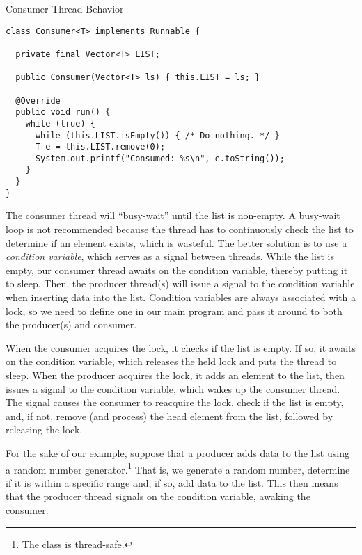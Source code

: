 \begin{cl}{Consumer Thread Behavior}
\begin{lstlisting}[language=MyJava]
class Consumer<T> implements Runnable {

  private final Vector<T> LIST;

  public Consumer(Vector<T> ls) { this.LIST = ls; }

  @Override
  public void run() {
    while (true) {
      while (this.LIST.isEmpty()) { /* Do nothing. */ }
      T e = this.LIST.remove(0);
      System.out.printf("Consumed: %s\n", e.toString());
    }
  }
}
\end{lstlisting}
\end{cl}

The consumer thread will ``busy-wait'' until the list is non-empty. A busy-wait loop is not recommended because the thread has to continuously check the list to determine if an element exists, which is wasteful. The better solution is to use a \textit{condition variable}, which serves as a signal between threads. While the list is empty, our consumer thread awaits on the condition variable, thereby putting it to sleep. Then, the producer thread(s) will issue a signal to the condition variable when inserting data into the list. Condition variables are always associated with a lock, so we need to define one in our main program and pass it around to both the producer(s) and consumer. 

When the consumer acquires the lock, it checks if the list is empty. If so, it awaits on the condition variable, which releases the held lock and puts the thread to sleep. When the producer acquires the lock, it adds an element to the list, then issues a signal to the condition variable, which wakes up the consumer thread. The signal causes the consumer to reacquire the lock, check if the list is empty, and, if not, remove (and process) the head element from the list, followed by releasing the lock.

For the sake of our example, suppose that a producer adds data to the list using a random number generator.\footnote{The  class is thread-safe.} That is, we generate a random number, determine if it is within a specific range and, if so, add data to the list. This then means that the producer thread signals on the condition variable, awaking the consumer.

